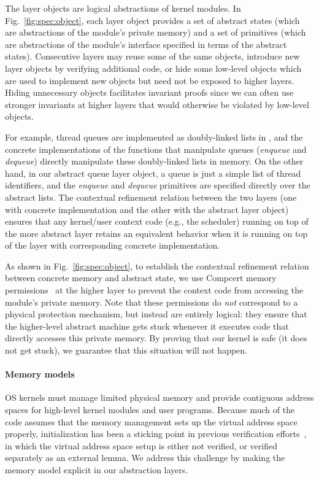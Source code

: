 The layer objects are logical abstractions of kernel modules. 
In Fig.~\ref{fig:spec:object},
each layer object provides a set of abstract
states (which are abstractions of the module's private memory)
and a set of primitives (which are abstractions of the module's
interface specified in terms of the abstract states).
Consecutive layers may reuse some of the same objects,
introduce new layer objects by verifying additional code,
or hide some low-level objects
which are used to implement new objects but need not be
exposed to higher layers. Hiding unnecessary objects
facilitates invariant proofs since we can often use
stronger invariants at higher layers that would otherwise 
be violated by low-level objects.

For example, thread queues are implemented as doubly-linked lists
in \mCTOS{}, and the concrete implementations of the functions that
manipulate queues ({\it enqueue} and
{\it dequeue}) directly manipulate these doubly-linked lists in memory.
On the other hand, in our abstract queue layer object, a queue
is just a simple list of thread identifiers, and 
the {\it enqueue} and {\it dequeue} primitives are
specified directly over the abstract lists.
The contextual refinement relation between
the two layers (one with concrete implementation and the other
with the abstract layer object) ensures that any kernel/user context code
(e.g., the scheduler) running on top of the more abstract layer retains an
equivalent behavior when it is running on top of the layer with corresponding
concrete implementation.

As shown in Fig.~\ref{fig:spec:object},
to establish the contextual refinement relation
between concrete memory and abstract state,
we use Compcert memory permissions~\cite{leroy08} at the higher layer
to prevent the context code
from accessing the module's private memory.
Note that these permissions do \emph{not}
correspond to a physical protection mechanism,
but instead are entirely logical:
they ensure that the higher-level abstract machine
gets stuck whenever it executes
code that directly accesses this private memory.
By proving that our kernel is safe (it does not get stuck),
we guarantee that this situation will not happen.

\paragraph{Memory models} 
OS kernels must manage limited physical memory and
provide contiguous address spaces
for high-level kernel modules and user programs.
Because much of the code assumes that 
the memory management sets up the virtual address space properly,
initialization has been a sticking point
in previous verification efforts~\cite{klein2009sel4, vaynberg12},
in which the virtual address space setup is either not verified,
or verified separately as an external lemma.
We address this challenge by making the memory model
explicit in our abstraction layers.

